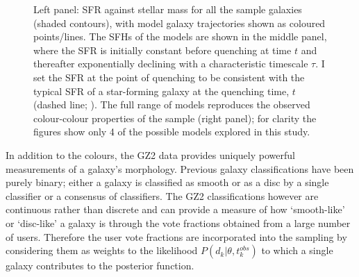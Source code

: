 \documentclass{mn2e}
\begin{document}
\begin{figure}
\caption{Left panel: SFR against stellar mass for all the sample galaxies (shaded contours), with model galaxy trajectories shown as coloured points/lines. The SFHs of the models are shown in the middle panel, where the SFR is initially constant before quenching at time $t$ and thereafter exponentially declining with a characteristic timescale $\tau$. I set the SFR at the point of quenching to be consistent with the typical SFR of a star-forming galaxy at the quenching time, $t$ (dashed line; \citealt{Peng}). The full range of models reproduces the observed colour-colour properties of the sample (right panel); for clarity the figures show only 4 of the possible models explored in this study.}
\label{sfr_mass_col}
\end{figure}

In addition to the colours, the GZ2 data provides uniquely powerful measurements of a galaxy's morphology. Previous galaxy classifications have been purely binary; either a galaxy is classified as smooth or as a disc by a single classifier or a consensus of classifiers. The GZ2 classifications however are continuous rather than discrete and can provide a measure of how `smooth-like' or `disc-like' a galaxy  is through the vote fractions obtained from a large number of users. Therefore the user vote fractions are incorporated into the sampling by considering them as weights to the likelihood $P(d_{k}|\theta, t^{obs}_{k})$ to which a single galaxy contributes to the posterior function. 


%
\end{document}
